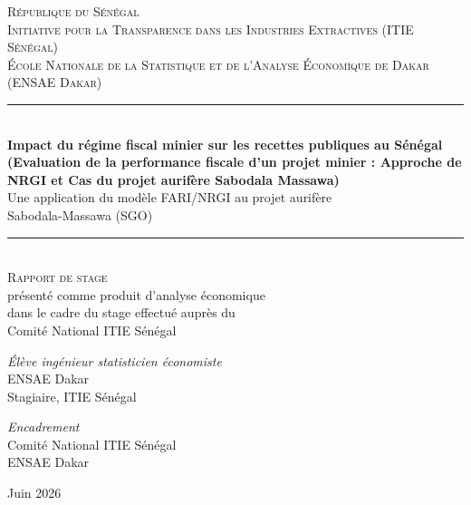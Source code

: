 \documentclass[12pt,a4paper]{report}
\begin{document}
\begin{titlepage}
\centering

{\large \textsc{République du Sénégal}}\\[0.2cm]
{\large \textsc{Initiative pour la Transparence dans les Industries Extractives (ITIE Sénégal)}}\\[0.2cm]
{\large \textsc{École Nationale de la Statistique et de l'Analyse Économique de Dakar (ENSAE Dakar)}}\\[1.5cm]

\rule{\textwidth}{0.4pt}\\[0.4cm]
{\Huge \bfseries Impact du régime fiscal minier sur les recettes publiques au Sénégal (Evaluation de la performance fiscale d'un projet minier : Approche de NRGI et Cas du projet aurifère Sabodala Massawa)}\\[0.4cm]
{\Large Une application du modèle FARI/NRGI au projet aurifère\\ Sabodala-Massawa (SGO)}\\[0.4cm]
\rule{\textwidth}{0.4pt}\\[1.5cm]

{\large \textsc{Rapport de stage}}\\[0.3cm]
{\large présenté comme produit d'analyse économique}\\
{\large dans le cadre du stage effectué auprès du}\\
{\large Comité National ITIE Sénégal}\\[2cm]

\vfill

\begin{minipage}{0.45\textwidth}
\begin{flushleft}
\large
\emph{Élève ingénieur statisticien économiste}\\
ENSAE Dakar\\
Stagiaire, ITIE Sénégal
\end{flushleft}
\end{minipage}
\hfill
\begin{minipage}{0.45\textwidth}
\begin{flushright}
\large
\emph{Encadrement}\\
Comité National ITIE Sénégal\\
ENSAE Dakar
\end{flushright}
\end{minipage}

\vfill

{\large Juin 2026}

\end{titlepage}
\end{document}
